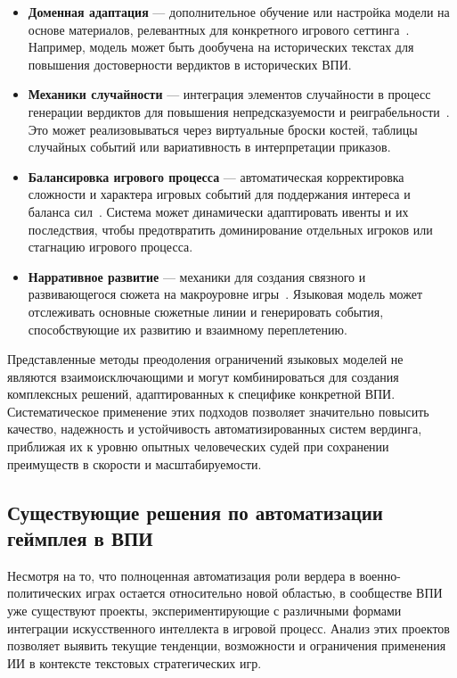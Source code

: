 \begin{itemize}
    \item \textbf{Доменная адаптация} — дополнительное обучение или настройка модели на основе материалов, релевантных для конкретного игрового сеттинга~\cite{gururangan2020don}. Например, модель может быть дообучена на исторических текстах для повышения достоверности вердиктов в исторических ВПИ.

    \item \textbf{Механики случайности} — интеграция элементов случайности в процесс генерации вердиктов для повышения непредсказуемости и реиграбельности~\cite{zhu2020text}. Это может реализовываться через виртуальные броски костей, таблицы случайных событий или вариативность в интерпретации приказов.

    \item \textbf{Балансировка игрового процесса} — автоматическая корректировка сложности и характера игровых событий для поддержания интереса и баланса сил~\cite{treanor2015ai}. Система может динамически адаптировать ивенты и их последствия, чтобы предотвратить доминирование отдельных игроков или стагнацию игрового процесса.

    \item \textbf{Нарративное развитие} — механики для создания связного и развивающегося сюжета на макроуровне игры~\cite{ryan2018open}. Языковая модель может отслеживать основные сюжетные линии и генерировать события, способствующие их развитию и взаимному переплетению.
\end{itemize}

Представленные методы преодоления ограничений языковых моделей не являются взаимоисключающими и могут комбинироваться для создания комплексных решений, адаптированных к специфике конкретной ВПИ. Систематическое применение этих подходов позволяет значительно повысить качество, надежность и устойчивость автоматизированных систем вердинга, приближая их к уровню опытных человеческих судей при сохранении преимуществ в скорости и масштабируемости.

\subsection{Существующие решения по автоматизации геймплея в ВПИ}

Несмотря на то, что полноценная автоматизация роли вердера в военно-политических играх остается относительно новой областью, в сообществе ВПИ уже существуют проекты, экспериментирующие с различными формами интеграции искусственного интеллекта в игровой процесс. Анализ этих проектов позволяет выявить текущие тенденции, возможности и ограничения применения ИИ в контексте текстовых стратегических игр.

